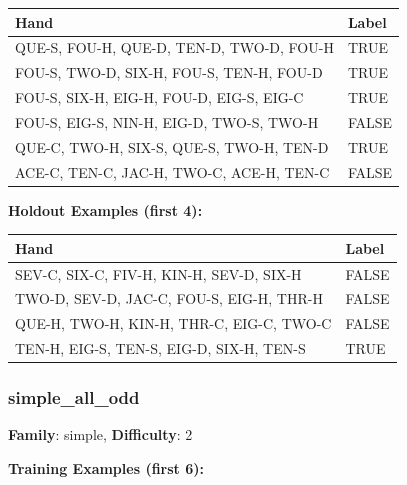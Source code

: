 \documentclass[10pt,a4paper]{article}
\begin{document}
\begin{small}
\begin{tabular}{p{8cm}l}
\toprule
Hand & Label \\
\midrule
QUE-S, FOU-H, QUE-D, TEN-D, TWO-D, FOU-H & \textcolor{positive}{TRUE} \\
FOU-S, TWO-D, SIX-H, FOU-S, TEN-H, FOU-D & \textcolor{positive}{TRUE} \\
FOU-S, SIX-H, EIG-H, FOU-D, EIG-S, EIG-C & \textcolor{positive}{TRUE} \\
FOU-S, EIG-S, NIN-H, EIG-D, TWO-S, TWO-H & \textcolor{negative}{FALSE} \\
QUE-C, TWO-H, SIX-S, QUE-S, TWO-H, TEN-D & \textcolor{positive}{TRUE} \\
ACE-C, TEN-C, JAC-H, TWO-C, ACE-H, TEN-C & \textcolor{negative}{FALSE} \\
\bottomrule
\end{tabular}
\end{small}

\textbf{Holdout Examples (first 4):}

\begin{small}
\begin{tabular}{p{8cm}l}
\toprule
Hand & Label \\
\midrule
SEV-C, SIX-C, FIV-H, KIN-H, SEV-D, SIX-H & \textcolor{negative}{FALSE} \\
TWO-D, SEV-D, JAC-C, FOU-S, EIG-H, THR-H & \textcolor{negative}{FALSE} \\
QUE-H, TWO-H, KIN-H, THR-C, EIG-C, TWO-C & \textcolor{negative}{FALSE} \\
TEN-H, EIG-S, TEN-S, EIG-D, SIX-H, TEN-S & \textcolor{positive}{TRUE} \\
\bottomrule
\end{tabular}
\end{small}

\vspace{0.5cm}

\subsubsection{simple\_all\_odd}

\textbf{Family}: simple, \textbf{Difficulty}: 2

\textbf{Training Examples (first 6):}
\end{document}
